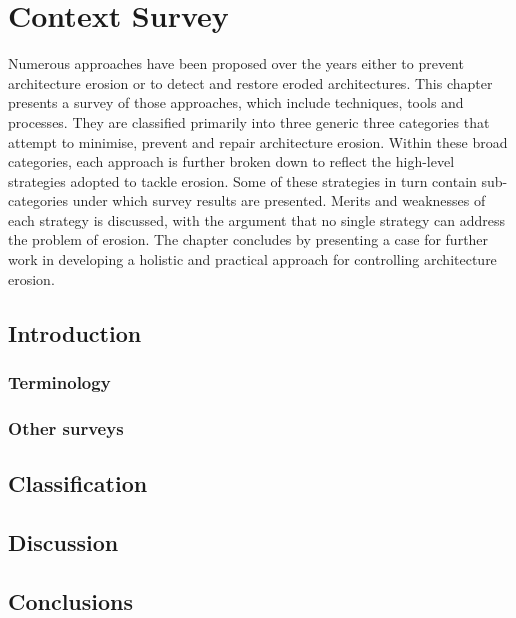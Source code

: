 %
%


\chapter{Context Survey}
\label{chap:background}
Numerous approaches have been proposed over the years either to prevent architecture erosion or to detect and restore eroded architectures. This chapter presents a survey of those approaches, which include techniques, tools and processes. They are classified primarily into three generic three categories that attempt to minimise, prevent and repair architecture erosion. Within these broad categories, each approach is further broken down  to reflect the high-level strategies adopted to tackle erosion. Some of these strategies in turn contain sub-categories under which survey results are presented. Merits and weaknesses of each strategy is discussed, with the argument that no single strategy can address the problem of erosion. The chapter concludes by presenting a case for further work in developing a holistic and practical approach for controlling architecture erosion.


\section{Introduction}
\subsection{Terminology}
\subsection{Other surveys}

\section{Classification}

\section{Discussion}

\section{Conclusions}

